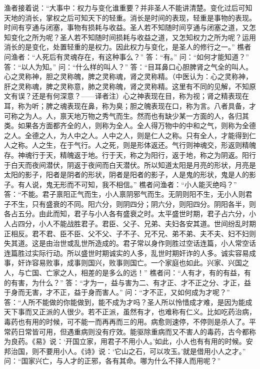 \documentclass[12pt,UTF8]{ctexbook}
\begin{document}
渔者接着说：“大事中：权力与变化谁重要？并非圣人不能讲清楚。变化过后可知天地的消长，掌权之后可知天下的轻重。消长是时间的表现，轻重是事物的表现。时间有亨通与闭塞，事物有损耗与收益。圣人若不知随时间亨通与闭塞之道，又怎知变化之所为呢？圣人若不知随时间损耗与收益之道，又怎知权力之所为呢？运用消长的是变化，处置轻重的是权力。因此权力与变化，是圣人的修行之一。”
樵者问渔者：“人死后有灵魂存在，有这种事么？”
答：“有。”
问：“如何才能知道？”
答：“以人为知。”
问：“什么样的叫人？”
答：“目耳鼻口心胆脾肾之气全的叫人。心之灵称神，胆之灵称魄，脾之灵称魂，肾之灵称精。（中医认为：心之灵称神，肝之灵称魂，脾之灵称意，肺之灵称魄，肾之灵称精。这里有不同的见解，不知原文有误？还是有何深意？——译者注）心之神表现在目，称为视；肾之精表现在耳，称为听；脾之魂表现在鼻，称为臭；胆之魄表现在口，称为言。八者具备，才可称之为人。人，禀天地万物之秀气而生。然而也有缺少某一方面的人，各归其类。如果各方面都齐全的人，则称为全人。全人得万物中的中和之气，则称为全德之人。全德之人，为人中之人。人中之人，则是仁人之称。只有全人，才能得到仁人之称。人之生，在于气行。人之死，则是形体返还。气行则神魂交，形返则精魄存。神魂行于天，精魄返于地。行于天，称之为阳行，返于地，称之为阴返。阳行于白天而夜间潜伏，阴返于夜间而白天潜伏。所以知道太阳是月亮的形状，月亮是太阳的影子，阳者是阴者的形状，阴者是阳者的影子，人是鬼的形状，鬼是人的影子。有人说，鬼无形而不可知，我不相信。”
樵者问渔者：“小人能灭绝吗？”
答：“不能。君子禀阳正气而生，小人禀阴邪气而生。无阴则阳不生，无小人则君子不生，只有盛衰的不同。阳六分，则阴四分；阴六分，则阳四分。阴阳各半，则各占五分。由此而知，君子与小人各有盛衰之时。太平盛世时期，君子占六分，小人占四分，小人不能战胜君子。君臣、父子、兄弟、夫妇各安其道。世间纷乱时期正相反。君不君、臣不臣、父不父、子不子、兄不兄、弟不弟、夫不夫、妇不妇则失其道。这是由治世或乱世所造成的。君子常以身作则胜过空话连篇，小人常空话连篇胜过实际行动。所以盛世时期诚实的人多，乱世时期奸诈的人多。诚实容易成事，奸诈容易败事，成事则国兴，败事则国亡。一个家庭也如此。兴家、兴国之人，与亡国、亡家之人，相差的是多么的远！”
樵者问：“人有才，有的有益，有的有害，为什么？”
答：“才为一，益与害为二、有才正、才不正之分、才正，益于身而无害，才不正，益于身而害人。”
问：“才不正，又如何成为才呢？”
答：“人所不能做的你能做到，能不成为才吗？圣人所以怜惜成才难，是因为能成天下事而又正派的人很少。若不正派，虽然有才，也难称有仁义。比如吃药治病，毒药也有用的时候，可不能一而再再而三的用。病愈则速停，不停则是杀人了。平常药日常皆可用，但遇重病则没有疗效。能驱除重病而又不害人的毒药，古今都称为良药。《易》说：‘开国立家，用君子不用小人。’如此，小人也有有用的时候。安邦治国，则不要用小人。《诗》说：‘它山之石，可以攻玉。’就是借用小人之才。”
问：“国家兴亡，与人才的正邪，各有其命。哪为什么不择人而用呢？”
\end{document}
